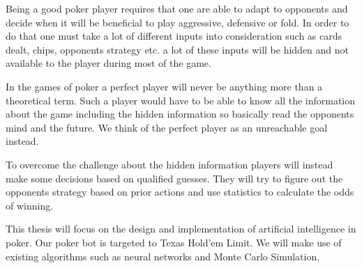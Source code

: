 Being a good poker player requires that one are able to adapt to opponents and decide when it will be beneficial to play aggressive, defensive or fold. In order to do that one must take a lot of different inputs into consideration such as cards dealt, chips, opponents strategy etc. a lot of these inputs will be hidden and not available to the player during most of the game.

In the games of poker a perfect player will never be anything more than a theoretical term. Such a player would have to be able to know all the information about the game including the hidden information so basically read the opponents mind and the future. We think of the perfect player as an unreachable goal instead.

To overcome the challenge about the hidden information players will instead make some decisions based on qualified guesses. They will try to figure out the opponents strategy based on prior actions and use statistics to calculate the odds of winning.

This thesis will focus on the design and implementation of artificial intelligence in poker. Our poker bot is targeted to Texas Hold'em Limit. We will make use of existing algorithms such as neural networks and Monte Carlo Simulation. 

